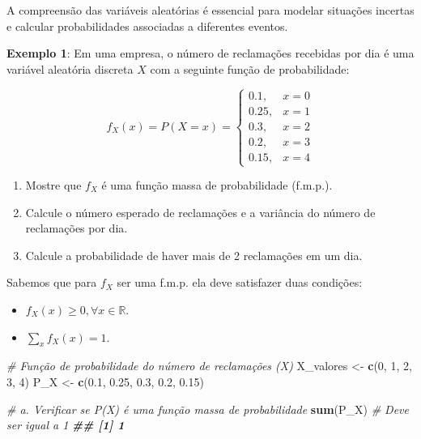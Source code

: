 \documentclass[
]{book}
\newenvironment{Shaded}{\begin{snugshade}}{\end{snugshade}}
\newcommand{\CommentTok}[1]{\textcolor[rgb]{0.56,0.35,0.01}{\textit{#1}}}
\newcommand{\DecValTok}[1]{\textcolor[rgb]{0.00,0.00,0.81}{#1}}
\newcommand{\DocumentationTok}[1]{\textcolor[rgb]{0.56,0.35,0.01}{\textbf{\textit{#1}}}}
\newcommand{\FloatTok}[1]{\textcolor[rgb]{0.00,0.00,0.81}{#1}}
\newcommand{\FunctionTok}[1]{\textcolor[rgb]{0.13,0.29,0.53}{\textbf{#1}}}
\newcommand{\NormalTok}[1]{#1}
\newcommand{\OtherTok}[1]{\textcolor[rgb]{0.56,0.35,0.01}{#1}}
\providecommand{\tightlist}{%
  \setlength{\itemsep}{0pt}\setlength{\parskip}{0pt}}
\begin{document}
A compreensão das variáveis aleatórias é essencial para modelar situações incertas e calcular probabilidades associadas a diferentes eventos.

\textbf{Exemplo 1}: Em uma empresa, o número de reclamações recebidas por dia é uma variável aleatória discreta \(X\) com a seguinte função de probabilidade:

\[f_{X}(x) = P(X = x) =
\begin{cases}
0.1, & x = 0 \\
0.25, & x = 1 \\
0.3, & x = 2 \\
0.2, & x = 3 \\
0.15, & x = 4
\end{cases}\]

\begin{enumerate}
\def\labelenumi{(\alph{enumi})}
\item
  Mostre que \(f_{X}\) é uma função massa de probabilidade (f.m.p.).
\item
  Calcule o número esperado de reclamações e a variância do número de reclamações por dia.
\item
  Calcule a probabilidade de haver mais de 2 reclamações em um dia.
\end{enumerate}

Sabemos que para \(f_{X}\) ser uma f.m.p. ela deve satisfazer duas condições:

\begin{itemize}
\tightlist
\item
  \(f_{X}(x) \geq 0, \forall x\in \mathbb{R}\).
\item
  \(\sum_{x}f_{X}(x)=1\).
\end{itemize}

\begin{Shaded}
\begin{Highlighting}[]
\CommentTok{\# Função de probabilidade do número de reclamações (X)}
\NormalTok{X\_valores }\OtherTok{\textless{}{-}} \FunctionTok{c}\NormalTok{(}\DecValTok{0}\NormalTok{, }\DecValTok{1}\NormalTok{, }\DecValTok{2}\NormalTok{, }\DecValTok{3}\NormalTok{, }\DecValTok{4}\NormalTok{)}
\NormalTok{P\_X }\OtherTok{\textless{}{-}} \FunctionTok{c}\NormalTok{(}\FloatTok{0.1}\NormalTok{, }\FloatTok{0.25}\NormalTok{, }\FloatTok{0.3}\NormalTok{, }\FloatTok{0.2}\NormalTok{, }\FloatTok{0.15}\NormalTok{)}

\CommentTok{\# a. Verificar se P(X) é uma função massa de probabilidade}
\FunctionTok{sum}\NormalTok{(P\_X)  }\CommentTok{\# Deve ser igual a 1}
\DocumentationTok{\#\# [1] 1}
\end{Highlighting}
\end{Shaded}
\end{document}
